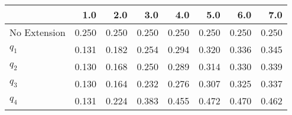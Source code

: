 \begin{tabular}{lrrrrrrr}
\toprule
{} &   1.0 &   2.0 &   3.0 &   4.0 &   5.0 &   6.0 &   7.0 \\
\midrule
No Extension & 0.250 & 0.250 & 0.250 & 0.250 & 0.250 & 0.250 & 0.250 \\
$q_1$        & 0.131 & 0.182 & 0.254 & 0.294 & 0.320 & 0.336 & 0.345 \\
$q_2$        & 0.130 & 0.168 & 0.250 & 0.289 & 0.314 & 0.330 & 0.339 \\
$q_3$        & 0.130 & 0.164 & 0.232 & 0.276 & 0.307 & 0.325 & 0.337 \\
$q_4$        & 0.131 & 0.224 & 0.383 & 0.455 & 0.472 & 0.470 & 0.462 \\
\bottomrule
\end{tabular}
